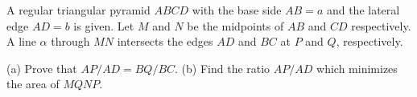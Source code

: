 A regular triangular pyramid $ABCD$ with the base side $AB=a$ and the lateral edge $AD=b$ is given. Let $M$ and $N$ be the midpoints of $AB$ and $CD$ respectively. A line $\alpha$ through $MN$ intersects the edges $AD$ and $BC$ at $P$ and $Q$, respectively.

(a) Prove that $AP/AD=BQ/BC$.
(b) Find the ratio $AP/AD$ which minimizes the area of $MQNP$.